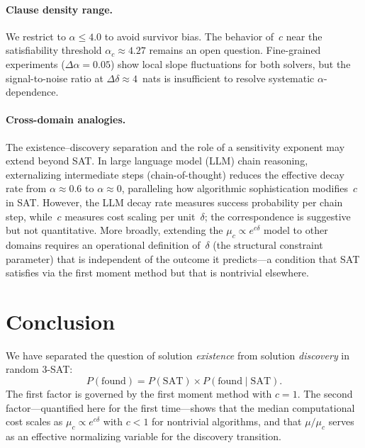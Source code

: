 \documentclass[11pt,a4paper]{article}
\newcommand{\mc}{\mu_c}
\newcommand{\Pfound}{P(\text{found})}
\newcommand{\PSAT}{P(\text{SAT})}
\newcommand{\PfSAT}{P(\text{found}\mid\text{SAT})}
\begin{document}
\paragraph{Clause density range.}
We restrict to $\alpha \leq 4.0$ to avoid survivor bias.
The behavior of~$c$ near the satisfiability threshold
$\alpha_c \approx 4.27$ remains an open question.
Fine-grained experiments ($\Delta\alpha = 0.05$) show
local slope fluctuations for both solvers, but the signal-to-noise
ratio at $\Delta\delta \approx 4$~nats is insufficient
to resolve systematic $\alpha$-dependence.

\paragraph{Cross-domain analogies.}
The existence--discovery separation and the role of a
sensitivity exponent may extend beyond SAT.
In large language model (LLM) chain reasoning,
externalizing intermediate steps (chain-of-thought) reduces
the effective decay rate from $\alpha \approx 0.6$ to
$\alpha \approx 0$, paralleling how algorithmic sophistication
modifies~$c$ in SAT.
However, the LLM decay rate measures success probability per
chain step, while~$c$ measures cost scaling per unit~$\delta$;
the correspondence is suggestive but not quantitative.
More broadly, extending the $\mc \propto e^{c\delta}$ model
to other domains requires an operational definition of~$\delta$
(the structural constraint parameter) that is independent of
the outcome it predicts---a condition that SAT satisfies
via the first moment method but that is nontrivial elsewhere.


\section{Conclusion}
\label{sec:conclusion}

We have separated the question of solution \emph{existence}
from solution \emph{discovery} in random 3-SAT:
\[
\Pfound = \PSAT \times \PfSAT.
\]
The first factor is governed by the first moment method with $c = 1$.
The second factor---quantified here for the first time---shows
that the median computational cost scales as $\mc \propto e^{c\delta}$
with $c < 1$ for nontrivial algorithms, and that $\mu/\mc$
serves as an effective normalizing variable for the discovery
transition.
\end{document}
